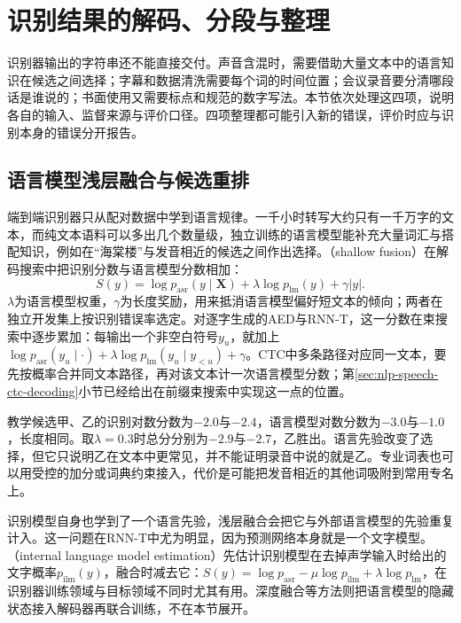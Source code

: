 \section{识别结果的解码、分段与整理}
\label{sec:nlp-speech-postprocessing}

识别器输出的字符串还不能直接交付。声音含混时，需要借助大量文本中的语言知识在候选之间选择；字幕和数据清洗需要每个词的时间位置；会议录音要分清哪段话是谁说的；书面使用又需要标点和规范的数字写法。本节依次处理这四项，说明各自的输入、监督来源与评价口径。四项整理都可能引入新的错误，评价时应与识别本身的错误分开报告。

\subsection{语言模型浅层融合与候选重排}
\label{sec:nlp-speech-fusion}

端到端识别器只从配对数据中学到语言规律。一千小时转写大约只有一千万字的文本，而纯文本语料可以多出几个数量级，独立训练的语言模型能补充大量词汇与搭配知识，例如在“海棠楼”与发音相近的候选之间作出选择。（shallow fusion）在解码搜索中把识别分数与语言模型分数相加：
\begin{equation}
 S(y)=\log p_{\mathrm{asr}}(y\mid\bm{X})
       +\lambda\log p_{\mathrm{lm}}(y)+\gamma |y|.
 \label{eq:nlp-speech-fusion}
\end{equation}
$\lambda$为语言模型权重，$\gamma$为长度奖励，用来抵消语言模型偏好短文本的倾向；两者在独立开发集上按识别错误率选定。对逐字生成的AED与RNN-T，这一分数在束搜索中逐步累加：每输出一个非空白符号$y_u$，就加上$\log p_{\mathrm{asr}}(y_u\mid\cdot)+\lambda\log p_{\mathrm{lm}}(y_u\mid y_{<u})+\gamma$。CTC中多条路径对应同一文本，要先按概率合并同文本路径，再对该文本计一次语言模型分数；第\ref{sec:nlp-speech-ctc-decoding}小节已经给出在前缀束搜索中实现这一点的位置。

教学候选甲、乙的识别对数分数为$-2.0$与$-2.4$，语言模型对数分数为$-3.0$与$-1.0$，长度相同。取$\lambda=0.3$时总分分别为$-2.9$与$-2.7$，乙胜出。语言先验改变了选择，但它只说明乙在文本中更常见，并不能证明录音中说的就是乙。专业词表也可以用受控的加分或词典约束接入，代价是可能把发音相近的其他词吸附到常用专名上。

识别模型自身也学到了一个语言先验，浅层融合会把它与外部语言模型的先验重复计入。这一问题在RNN-T中尤为明显，因为预测网络本身就是一个文字模型。（internal language model estimation）先估计识别模型在去掉声学输入时给出的文字概率$p_{\mathrm{ilm}}(y)$，融合时减去它：$S(y)=\log p_{\mathrm{asr}}-\mu\log p_{\mathrm{ilm}}+\lambda\log p_{\mathrm{lm}}$，在识别器训练领域与目标领域不同时尤其有用。深度融合等方法则把语言模型的隐藏状态接入解码器再联合训练，不在本节展开。


